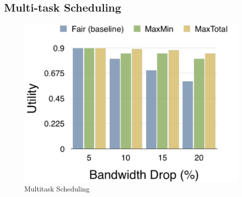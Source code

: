 \subsection{Multi-task Scheduling}
\label{sec:multi-task-sched}

\begin{figure}
  \centering
  \includegraphics[width=\columnwidth]{figures/multitask.pdf}
  \caption{Multitask Scheduling}
  \label{fig:multitask}
\end{figure}

